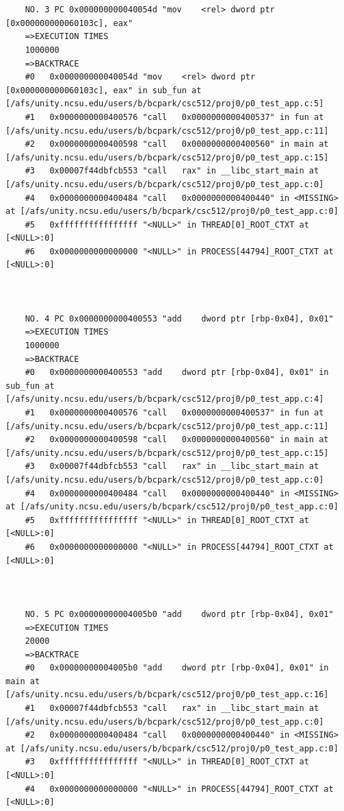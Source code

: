 \documentclass[11pt]{article}
\begin{document}
\begin{verbatim}
    
    
    NO. 3 PC 0x000000000040054d "mov    <rel> dword ptr [0x000000000060103c], eax"
    =>EXECUTION TIMES
    1000000
    =>BACKTRACE
    #0   0x000000000040054d "mov    <rel> dword ptr [0x000000000060103c], eax" in sub_fun at [/afs/unity.ncsu.edu/users/b/bcpark/csc512/proj0/p0_test_app.c:5]
    #1   0x0000000000400576 "call   0x0000000000400537" in fun at [/afs/unity.ncsu.edu/users/b/bcpark/csc512/proj0/p0_test_app.c:11]
    #2   0x0000000000400598 "call   0x0000000000400560" in main at [/afs/unity.ncsu.edu/users/b/bcpark/csc512/proj0/p0_test_app.c:15]
    #3   0x00007f44dbfcb553 "call   rax" in __libc_start_main at [/afs/unity.ncsu.edu/users/b/bcpark/csc512/proj0/p0_test_app.c:0]
    #4   0x0000000000400484 "call   0x0000000000400440" in <MISSING> at [/afs/unity.ncsu.edu/users/b/bcpark/csc512/proj0/p0_test_app.c:0]
    #5   0xffffffffffffffff "<NULL>" in THREAD[0]_ROOT_CTXT at [<NULL>:0]
    #6   0x0000000000000000 "<NULL>" in PROCESS[44794]_ROOT_CTXT at [<NULL>:0]
    
    
    
    NO. 4 PC 0x0000000000400553 "add    dword ptr [rbp-0x04], 0x01"
    =>EXECUTION TIMES
    1000000
    =>BACKTRACE
    #0   0x0000000000400553 "add    dword ptr [rbp-0x04], 0x01" in sub_fun at [/afs/unity.ncsu.edu/users/b/bcpark/csc512/proj0/p0_test_app.c:4]
    #1   0x0000000000400576 "call   0x0000000000400537" in fun at [/afs/unity.ncsu.edu/users/b/bcpark/csc512/proj0/p0_test_app.c:11]
    #2   0x0000000000400598 "call   0x0000000000400560" in main at [/afs/unity.ncsu.edu/users/b/bcpark/csc512/proj0/p0_test_app.c:15]
    #3   0x00007f44dbfcb553 "call   rax" in __libc_start_main at [/afs/unity.ncsu.edu/users/b/bcpark/csc512/proj0/p0_test_app.c:0]
    #4   0x0000000000400484 "call   0x0000000000400440" in <MISSING> at [/afs/unity.ncsu.edu/users/b/bcpark/csc512/proj0/p0_test_app.c:0]
    #5   0xffffffffffffffff "<NULL>" in THREAD[0]_ROOT_CTXT at [<NULL>:0]
    #6   0x0000000000000000 "<NULL>" in PROCESS[44794]_ROOT_CTXT at [<NULL>:0]
    
    
    
    NO. 5 PC 0x00000000004005b0 "add    dword ptr [rbp-0x04], 0x01"
    =>EXECUTION TIMES
    20000
    =>BACKTRACE
    #0   0x00000000004005b0 "add    dword ptr [rbp-0x04], 0x01" in main at [/afs/unity.ncsu.edu/users/b/bcpark/csc512/proj0/p0_test_app.c:16]
    #1   0x00007f44dbfcb553 "call   rax" in __libc_start_main at [/afs/unity.ncsu.edu/users/b/bcpark/csc512/proj0/p0_test_app.c:0]
    #2   0x0000000000400484 "call   0x0000000000400440" in <MISSING> at [/afs/unity.ncsu.edu/users/b/bcpark/csc512/proj0/p0_test_app.c:0]
    #3   0xffffffffffffffff "<NULL>" in THREAD[0]_ROOT_CTXT at [<NULL>:0]
    #4   0x0000000000000000 "<NULL>" in PROCESS[44794]_ROOT_CTXT at [<NULL>:0]
    

\end{verbatim}
\end{document}
